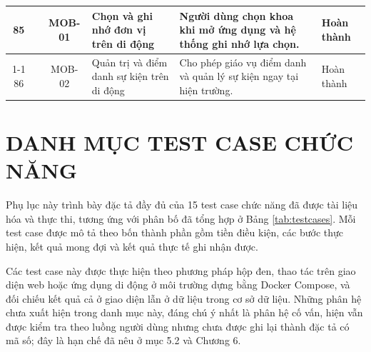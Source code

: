 \documentclass[12pt,a4paper,oneside]{report}
\begin{document}
\begin{landscape}
\begin{longtable}{|c|>{\raggedright\arraybackslash}p{3.1cm}|c|>{\raggedright\arraybackslash}p{4.6cm}|>{\raggedright\arraybackslash}p{8.4cm}|>{\raggedright\arraybackslash}p{2.4cm}|}
\hline
85 &  & MOB-01 & Chọn và ghi nhớ đơn vị trên di động & Người dùng chọn khoa khi mở ứng dụng và hệ thống ghi nhớ lựa chọn. & Hoàn thành \\
\cline{1-1}\cline{3-6}
86 & \multirow{-2}{2.4cm}{\textbf{Ứng dụng di động}} & MOB-02 & Quản trị và điểm danh sự kiện trên di động & Cho phép giáo vụ điểm danh và quản lý sự kiện ngay tại hiện trường. & Hoàn thành \\
\hline
\end{longtable}
\end{landscape}
\renewcommand{\arraystretch}{1}


\chapter{DANH MỤC TEST CASE CHỨC NĂNG}

Phụ lục này trình bày đặc tả đầy đủ của 15 test case chức năng đã được tài liệu hóa và thực thi, tương ứng với phân bố đã tổng hợp ở Bảng \ref{tab:testcases}. Mỗi test case được mô tả theo bốn thành phần gồm tiền điều kiện, các bước thực hiện, kết quả mong đợi và kết quả thực tế ghi nhận được.

Các test case này được thực hiện theo phương pháp hộp đen, thao tác trên giao diện web hoặc ứng dụng di động ở môi trường dựng bằng Docker Compose, và đối chiếu kết quả cả ở giao diện lẫn ở dữ liệu trong cơ sở dữ liệu. Những phân hệ chưa xuất hiện trong danh mục này, đáng chú ý nhất là phân hệ cố vấn, hiện vẫn được kiểm tra theo luồng người dùng nhưng chưa được ghi lại thành đặc tả có mã số; đây là hạn chế đã nêu ở mục 5.2 và Chương 6.
\end{document}
